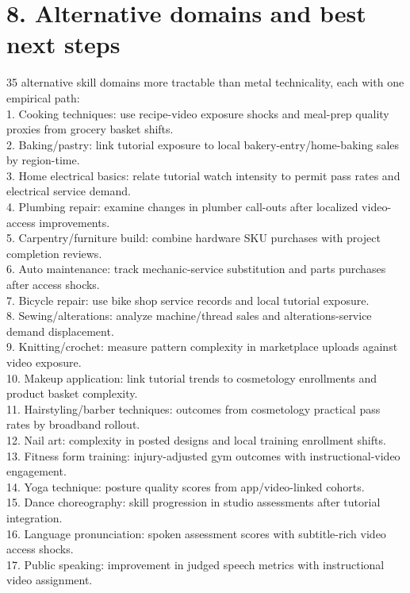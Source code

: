 \documentclass[11pt]{article}
\begin{document}
\section*{8. Alternative domains and best next steps}
35 alternative skill domains more tractable than metal technicality, each with one empirical path:\\
1. Cooking techniques: use recipe-video exposure shocks and meal-prep quality proxies from grocery basket shifts.\\
2. Baking/pastry: link tutorial exposure to local bakery-entry/home-baking sales by region-time.\\
3. Home electrical basics: relate tutorial watch intensity to permit pass rates and electrical service demand.\\
4. Plumbing repair: examine changes in plumber call-outs after localized video-access improvements.\\
5. Carpentry/furniture build: combine hardware SKU purchases with project completion reviews.\\
6. Auto maintenance: track mechanic-service substitution and parts purchases after access shocks.\\
7. Bicycle repair: use bike shop service records and local tutorial exposure.\\
8. Sewing/alterations: analyze machine/thread sales and alterations-service demand displacement.\\
9. Knitting/crochet: measure pattern complexity in marketplace uploads against video exposure.\\
10. Makeup application: link tutorial trends to cosmetology enrollments and product basket complexity.\\
11. Hairstyling/barber techniques: outcomes from cosmetology practical pass rates by broadband rollout.\\
12. Nail art: complexity in posted designs and local training enrollment shifts.\\
13. Fitness form training: injury-adjusted gym outcomes with instructional-video engagement.\\
14. Yoga technique: posture quality scores from app/video-linked cohorts.\\
15. Dance choreography: skill progression in studio assessments after tutorial integration.\\
16. Language pronunciation: spoken assessment scores with subtitle-rich video access shocks.\\
17. Public speaking: improvement in judged speech metrics with instructional video assignment.\\
\end{document}
